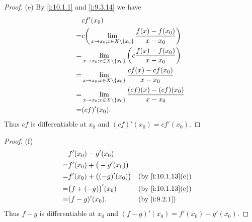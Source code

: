 \begin{proof}{(e)}
  By \cref{i:10.1.1} and \cref{i:9.3.14} we have
  \begin{align*}
      & cf'(x_0)                                                                                    \\
    = & c \bigg(\lim_{x \to x_0 ; x \in X \setminus \left\lbrace x_0\right\rbrace} \dfrac{f(x) - f(x_0)}{x - x_0}\bigg) \\
    = & \lim_{x \to x_0 ; x \in X \setminus \left\lbrace x_0\right\rbrace} \bigg(c \dfrac{f(x) - f(x_0)}{x - x_0}\bigg) \\
    = & \lim_{x \to x_0 ; x \in X \setminus \left\lbrace x_0\right\rbrace} \dfrac{cf(x) - cf(x_0)}{x - x_0}             \\
    = & \lim_{x \to x_0 ; x \in X \setminus \left\lbrace x_0\right\rbrace} \dfrac{(cf)(x) - (cf)(x_0)}{x - x_0}         \\
    = & (cf)'(x_0).
  \end{align*}
  Thus \(cf\) is differentiable at \(x_0\) and \((cf)'(x_0) = cf'(x_0)\).
\end{proof}

\begin{proof}{(f)}
  \begin{align*}
      & f'(x_0) - g'(x_0)                                     \\
    = & f'(x_0) + \big(-g'(x_0)\big)                          \\
    = & f'(x_0) + \big((-g)'(x_0)\big) &  & \by{i:10.1.13}[e] \\
    = & \big(f + (-g)\big)'(x_0)       &  & \by{i:10.1.13}[c] \\
    = & (f - g)'(x_0).                 &  & \by{i:9.2.1}
  \end{align*}
  Thus \(f - g\) is differentiable at \(x_0\) and \((f - g)'(x_0) = f'(x_0) - g'(x_0)\).
\end{proof}

